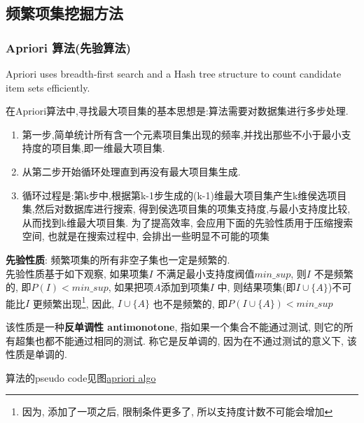 \documentclass{article}
\begin{document}
\subsection{频繁项集挖掘方法}
\subsubsection{Apriori 算法(先验算法)}
Apriori uses breadth-first search and a Hash tree structure to count candidate item sets efficiently.

在Apriori算法中,寻找最大项目集的基本思想是:算法需要对数据集进行多步处理.
\begin{enumerate}
	\item 第一步,简单统计所有含一个元素项目集出现的频率,并找出那些不小于最小支持度的项目集,即一维最大项目集.
	\item 从第二步开始循环处理直到再没有最大项目集生成.
	\item 循环过程是:第k步中,根据第k-1步生成的(k-1)维最大项目集产生k维侯选项目集,然后对数据库进行搜索,
			得到侯选项目集的项集支持度,与最小支持度比较,从而找到k维最大项目集. 为了提高效率, 会应用下面的先验性质用于压缩搜索空间,
			也就是在搜索过程中, 会排出一些明显不可能的项集
\end{enumerate}

\textbf{先验性质}: 频繁项集的所有非空子集也一定是频繁的.\\
先验性质基于如下观察, 如果项集$I$ 不满足最小支持度阀值$min\_sup$, 则$I$ 不是频繁的, 即$P(I) < min\_sup$, 如果把项$A$添加到项集$I$ 中, 则结果项集(即$I \cup \{A\}$)不可能比$I$ 更频繁出现\footnote{因为, 添加了一项之后, 限制条件更多了, 所以支持度计数不可能会增加}, 因此, $I \cup \{A\}$ 也不是频繁的, 即$P(I \cup \{A\}) < min\_sup$

该性质是一种\textbf{反单调性 antimonotone}, 指如果一个集合不能通过测试, 则它的所有超集也都不能通过相同的测试. 称它是反单调的, 因为在不通过测试的意义下, 该性质是单调的.

算法的pseudo code见图\href{http://i.imgbox.com/ZKLH7OMB.png}{apriori algo}
\end{document}
